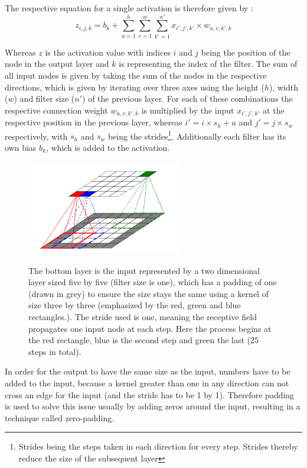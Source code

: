 The respective equation for a single activation is therefore given by \cite[p. 453]{Geron2019}:
\begin{equation}
z_{i,j,k} = b_k + \sum_{u=1}^{h} \sum_{v=1}^{w} \sum_{k'=1}^{n'} x_{i', j', k'} \times w_{u, v, k', k} 
\end{equation}

Whereas $z$ is the activation value with indices $i$ and $j$ being the position of the node in the output layer and $k$ is representing the index of the filter.
The sum of all input nodes is given by taking the sum of the nodes in the respective directions, which is given by iterating over three axes using the height ($h$), width ($w$) and filter size ($n'$) of the previous layer.
For each of these combinations the respective connection weight $w_{u, v, k', k}$ is multiplied by the input $x_{i', j', k'}$ at the respective position in the previous layer, whereas $i' = i \times s_h + u$ and $j' = j \times s_w$ respectively, with $s_h$ and $s_w$ being the strides\footnote{Strides being the steps taken in each direction for every step. Strides thereby reduce the size of the subsequent layer}.
Additionally each filter has its own bias $b_k$, which is added to the activation.

\begin{figure}
    \centering
    \caption{ The bottom layer is the input represented by a two dimensional layer sized five by five (filter size is one), which has a padding of one (drawn in grey) to ensure the size stays the same using a kernel of size three by three (emphasized by the red, green and blue rectangles.). The stride used is one, meaning the receptive field propagates one input node at each step. Here the process begins at the red rectangle, blue is the second step and green the last (25  steps in total). }
    \includegraphics[width=0.6\textwidth]{images/conv_layer.png}
    \label{fig:conv_layer}
\end{figure}

In order for the output to have the same size as the input, numbers have to be added to the input, because a kernel greater than one in any direction can not cross an edge for the input (and the stride has to be 1 by 1).
Therefore padding is used to solve this issue usually by adding zeros around the input, resulting in a technique called zero-padding.


